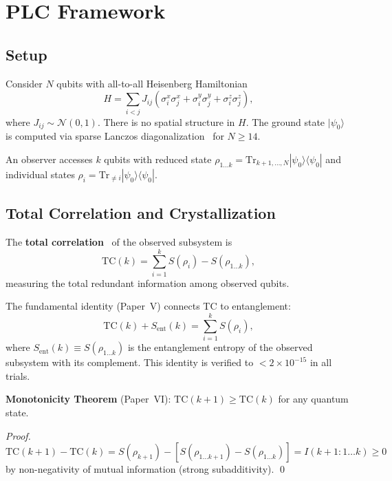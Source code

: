 \documentclass[aps,pra,twocolumn,superscriptaddress,floatfix]{revtex4-2}
\begin{document}
\section{PLC Framework}
\label{sec:plc}

\subsection{Setup}

Consider $N$ qubits with all-to-all Heisenberg Hamiltonian
\begin{equation}
H = \sum_{i<j} J_{ij} \left(\sigma^x_i \sigma^x_j + \sigma^y_i \sigma^y_j + \sigma^z_i \sigma^z_j\right),
\label{eq:hamiltonian}
\end{equation}
where $J_{ij} \sim \mathcal{N}(0,1)$.
There is no spatial structure in $H$.
The ground state $|\psi_0\rangle$ is computed via sparse Lanczos diagonalization~\cite{lehoucq1998} for $N \geq 14$.

An observer accesses $k$ qubits with reduced state $\rho_{1\ldots k} = \mathrm{Tr}_{k+1,\ldots,N}|\psi_0\rangle\langle\psi_0|$ and individual states $\rho_i = \mathrm{Tr}_{\neq i}|\psi_0\rangle\langle\psi_0|$.

\subsection{Total Correlation and Crystallization}

The \textbf{total correlation}~\cite{watanabe1960} of the observed subsystem is
\begin{equation}
\mathrm{TC}(k) = \sum_{i=1}^{k} S(\rho_i) - S(\rho_{1\ldots k}),
\label{eq:tc}
\end{equation}
measuring the total redundant information among observed qubits.

The fundamental identity (Paper~V) connects TC to entanglement:
\begin{equation}
\mathrm{TC}(k) + S_{\mathrm{ent}}(k) = \sum_{i=1}^{k} S(\rho_i),
\label{eq:identity}
\end{equation}
where $S_{\mathrm{ent}}(k) \equiv S(\rho_{1\ldots k})$ is the entanglement entropy of the observed subsystem with its complement.
This identity is verified to $< 2 \times 10^{-15}$ in all trials.

\textbf{Monotonicity Theorem} (Paper~VI):
$\mathrm{TC}(k+1) \geq \mathrm{TC}(k)$ for any quantum state.

\emph{Proof.}
$\mathrm{TC}(k+1) - \mathrm{TC}(k) = S(\rho_{k+1}) - [S(\rho_{1\ldots k+1}) - S(\rho_{1\ldots k})] = I(k\!+\!1 : 1\!\ldots\! k) \geq 0$
by non-negativity of mutual information (strong subadditivity). \qed
\end{document}
